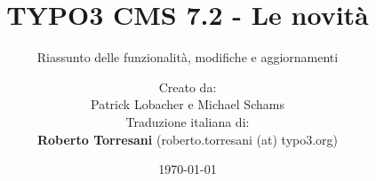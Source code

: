 %

%
%

\documentclass[t]{beamer}

\beamertemplatenavigationsymbolsempty

{
	\usetheme{typo3slides}
}

\title{TYPO3 CMS 7.2 - Le novità}
\subtitle{Riassunto delle funzionalità, modifiche e aggiornamenti}
\author{
	\centerline{Creato da:}
	\centerline{Patrick Lobacher e Michael Schams}
	\vspace{0.4cm}
	\centerline{Traduzione italiana di:}
	\textbf{Roberto Torresani} (roberto.torresani (at) typo3.org)
}

\date{\today}



\sharefont


\begingroup
	[default]
	\begin{frame}
		\titlepage
	\end{frame}
\endgroup


\section*{TYPO3 CMS 7.2 - Le novità}
\begin{frame}[fragile]
	\frametitle{Indice delle sezioni}
	\framesubtitle{Indice delle sezioni}

	\begin{multicols}{2}
		\tableofcontents
	\end{multicols}

\end{frame}

